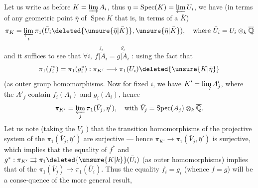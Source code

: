 Let us write as before $K=\varinjlim A_i$, thus  $\eta=\operatorname{Spec}(K)=\varprojlim U_i$, we have (in terms of any geometric point $\bar\eta$ of $\operatorname{Spec}K$ that is, in terms of a $\bar K$)
\[
\pi_K=\varprojlim_i\pi_1(\bar U_i\deleted{\unsure{\bar\eta|\bar K}},\unsure{\bar\eta|\bar K}),\quad\text{where }\bar U_i=U_i\otimes_k\overline{\mathbb Q}
\]
and it suffices to see that $\forall i,\ \overset{f_i}{\overline{f|A_i}}=\overset{g_i}{\overline{g|A_i}}$ : using the fact that
\[
\pi_1(f_i^*)=\pi_1(g_i^*):\pi_{K'}\longrightarrow\pi_1(U_i)\deleted{\unsure{K|\bar\eta}}
\]
(as outer group homomorphisms. Now for fixed $i$, we have $K'=\varinjlim A'_j$, where the $A'_j$ contain $f_i(A_i)$ and $g_i(A_i)$, hence
\[
\pi_{K'}=\varprojlim_j\pi_1(\bar V_j,\bar\eta'),\quad\text{with }\bar V_j=\operatorname{Spec}(A_j)\otimes_k\overline{\mathbb Q}.
\]
Let us note (taking the $V_j$ ) that the transition homomorphisms of the projective system of the $\pi_1(\bar V_j,\bar\eta')$ are surjective --- hence $\pi_{K'}\longrightarrow\pi_1(\bar V_j,\bar\eta')$ is surjective, which implies that the equality of $f^*$ and $g^*:\pi_{K'}\rightrightarrows\pi_1\deleted{\unsure{K|k}}(\bar U_i)$ (as outer homomorphisms) implies that of the $\pi_1(\bar V_j)\longrightarrow\pi_1(\bar U_i)$.
Thus the equality $f_i=g_i$ (whence $f=g$) will be a conse-quence of the more general result,
